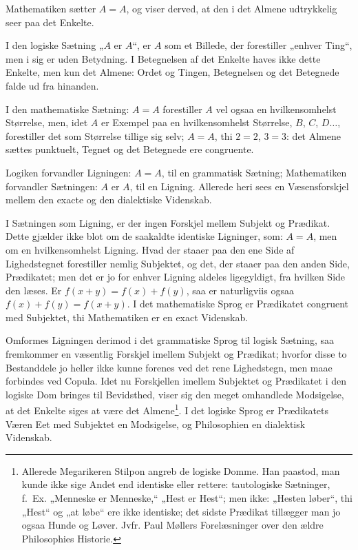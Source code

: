 \documentclass[12pt]{book}
\newcommand{\opage}[1]{\marginnote{\footnotesize\textit{[#1]}}}
\begin{document}
Mathematiken sætter $A = A$, og viser derved, at den i det Almene udtrykkelig
seer paa det Enkelte.

I den logiske Sætning „$A$ er $A$“, er $A$ som et Billede, der forestiller
„enhver Ting“, men i sig er uden Betydning. I Betegnelsen af det Enkelte haves
ikke dette Enkelte, men kun det Almene: Ordet og Tingen, Betegnelsen og det
Betegnede falde ud fra hinanden.

I den mathematiske Sætning: $A = A$ forestiller $A$ vel ogsaa en
hvilkensomhelst Størrelse, men, idet $A$ er Exempel paa en hvilkensomhelst
Størrelse, $B$, $C$, $D\ldots$, forestiller det som Størrelse tillige sig selv;
$A = A$, thi $2 = 2$, $3 = 3$: det Almene sættes punktuelt, Tegnet og det
Betegnede ere congruente.

Logiken forvandler Ligningen: $A = A$, til en grammatisk Sætning; Mathematiken
forvandler Sætningen: $A$ er $A$, til en Ligning. Allerede heri sees en
Væsensforskjel mellem den exacte og den dialektiske Videnskab.

I Sætningen som Ligning, er der ingen Forskjel mellem Subjekt og Prædikat. Dette
gjælder ikke blot om de saakaldte identiske Ligninger, som: $A = A$, men om en
hvilkensomhelst Ligning. Hvad der staaer paa den ene Side af Lighedstegnet
forestiller nemlig Subjektet, og det, der
\opage{12} staaer paa den anden Side, Prædikatet; men det er jo for enhver Ligning aldeles
ligegyldigt, fra hvilken Side den læses. Er $f(x+y) = f(x) + f(y)$, saa er
naturligviis ogsaa $f(x) + f(y) = f(x+y)$. I det mathematiske Sprog er
Prædikatet congruent med Subjektet, thi Mathematiken er en exact Videnskab.

Omformes Ligningen derimod i det grammatiske Sprog til logisk Sætning, saa
fremkommer en væsentlig Forskjel imellem Subjekt og Prædikat; hvorfor disse to
Bestanddele jo heller ikke kunne forenes ved det rene Lighedstegn, men maae
forbindes ved Copula. Idet nu Forskjellen imellem Subjektet og Prædikatet i den
logiske Dom bringes til Bevidsthed, viser sig den meget omhandlede Modsigelse,
at det Enkelte siges at være det Almene\footnote{Allerede Megarikeren Stilpon
angreb de logiske Domme. Han paastod, man kunde ikke sige Andet end identiske
eller rettere: tautologiske Sætninger, f.\ Ex. „Menneske er Menneske,“ „Hest er
Hest“; men ikke: „Hesten løber“, thi „Hest“ og „at løbe“ ere ikke identiske; det
sidste Prædikat tillægger man jo ogsaa Hunde og Løver. Jvfr. Paul Møllers
Forelæsninger over den ældre Philosophies Historie.}. I det logiske Sprog er
Prædikatets Væren Eet med Subjektet en Modsigelse, og Philosophien en dialektisk
Videnskab.
\end{document}
